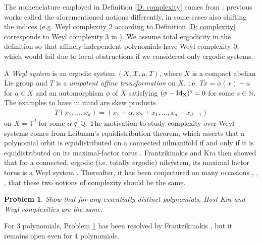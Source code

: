 \documentclass[11pt]{amsart}
\newtheorem{problem}{Problem}
\theoremstyle{definition}
\newcommand{\N}{{\mathbb N}}
\newcommand{\Q}{{\mathbb Q}}
\newcommand{\T}{{\mathbb T}}
\newcommand{\CX}{{\mathcal X}}
\newcommand{\1}{{\mathbf{1}}}
\begin{document}
The nomenclature employed in Definition \ref{D: complexity} comes from \cite{Kuc22a}; previous works called the aforementioned notions differently, in some cases also shifting the indices (e.g. Weyl complexity 2 according to Definition \ref{D: complexity} corresponds to Weyl complexity 3 in \cite{Fr08}). 
We assume total ergodicity in the definition so that affinely independent polynomials have Weyl complexity 0, which would fail due to local obstructions if we considered only ergodic systems.

A \emph{Weyl system} is an ergodic system $(X, \CX, \mu, T)$, where $X$ is a compact abelian Lie group and $T$ is a \emph{unipotent affine transformation} on $X$, i.e. $Tx = \phi(x) + a$ for $a\in X$ and an automorphism $\phi$ of $X$ satisfying $(\phi - \rm{Id}_X)^s = 0$ for some $s\in\N$. The examples to have in mind are skew products
\begin{align*}
    T(x_1, \ldots, x_d) = (x_1 + \alpha, x_2 + x_1, \ldots, x_d + x_{d-1})
\end{align*}
on $X=\T^d$ for some $\alpha\notin\Q$. The motivation to study complexity over Weyl systems comes from 
Leibman's equidistribution theorem, which asserts that a polynomial orbit is equidistributed on a connected nilmanifold if and only if it is equidistributed on its maximal-factor torus \cite{L05c, L05b}. Frantzikinakis and Kra then showed that for a connected, ergodic (i.e. totally ergodic) nilsystem, its maximal factor torus is a Weyl system \cite[Proposition 3.1]{FrKr05}. Thereafter, it has been conjectured on many occasions \cite[Section 0.10]{L09}, \cite[Section 0.B]{BLL07}, \cite[Section 5.1.1]{Fr16}, \cite[Conjecture 1.9]{Kuc22a} that these two notions of complexity should be the same.
\begin{problem}\label{Pr: Host and Weyl complexities are the same}
    Show that for any essentially distinct polynomials, Host-Kra and Weyl complexities are the same.
\end{problem}
For 3 polynomials, Problem \ref{Pr: Host and Weyl complexities are the same} has been resolved by Frantzikinakis \cite{Fr08}, but it remains open even for 4 polynomials.
\end{document}
